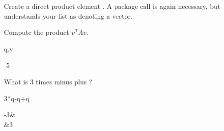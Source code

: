 {{{{\begin{xtc}
\end{xtc}
\begin{xtc}
\begin{xtccomment}
Create a direct product element .
A package call is again necessary, but \Language{}
understands your list as denoting a vector.
\end{xtccomment}
\begin{TeXOutput}
\begin{fricasmath}{4}
%
\end{fricasmath}
\end{TeXOutput}
\end{xtc}
\begin{xtc}
\begin{xtccomment}
Compute the product $v^TAv$.
\end{xtccomment}
\begin{spadsrc}
q.v
\end{spadsrc}
\begin{TeXOutput}
\begin{fricasmath}{5}
-{5}%
\end{fricasmath}
\end{TeXOutput}
\end{xtc}
\begin{xtc}
\begin{xtccomment}
What is 3 times  minus  plus ?
\end{xtccomment}
\begin{spadsrc}
3*q-q+q
\end{spadsrc}
\begin{TeXOutput}
\begin{fricasmath}{6}
\begin{MATRIX}{2}-{3}&\\&3\end{MATRIX}%
\end{fricasmath}
\end{TeXOutput}
\end{xtc}

}}}}
